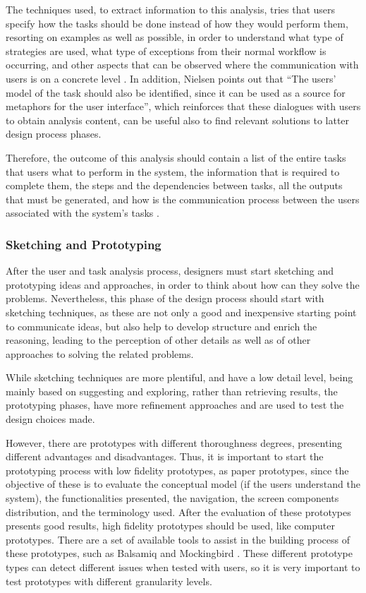 The techniques used, to extract information to this analysis, tries that users specify how the tasks should be done instead of how they would perform them, resorting on examples as well as possible, in order to understand what type of strategies are used, what type of exceptions from their normal workflow is occurring, and other aspects that can be observed where the communication with users is on a concrete level \cite{usabilityEngineering}. In addition, Nielsen \cite{usabilityEngineering} points out that  “The users' model of the task should also be identified, since it can be used as a source for metaphors for the user interface”, which reinforces that these dialogues with users to obtain analysis content, can be useful also to find relevant solutions to latter design process phases.

Therefore, the outcome of this analysis should contain a list of the entire tasks that users what to perform in the system, the information that is required to complete them, the steps and the dependencies between tasks, all the outputs that must be generated, and how is the communication process between the users associated with the system’s tasks \cite{usabilityEngineering}.


\subsubsection{Sketching and Prototyping}
\label{subsubsec:sketching_and_prototyping}
After the user and task analysis process, designers must start sketching and prototyping ideas and approaches, in order to think about how can they solve the problems. Nevertheless, this phase of the design process should start with sketching techniques, as these are not only a good and inexpensive starting point to communicate ideas, but also help to develop structure and enrich the reasoning, leading to the perception of other details as well as of other approaches to solving the related problems.

While sketching techniques are more plentiful, and have a low detail level, being mainly based on suggesting and exploring, rather than retrieving results, the prototyping phases, have more refinement approaches and are used to test the design choices made.

However, there are prototypes with different thoroughness degrees, presenting different advantages and disadvantages. Thus, it is important to start the prototyping process with low fidelity prototypes, as paper prototypes, since the objective of these is to evaluate the conceptual model (if the users understand the system), the functionalities presented, the navigation, the screen components distribution, and the terminology used. After the evaluation of these prototypes presents good results, high fidelity prototypes should be used, like computer prototypes. There are a set of available tools to assist in the building process of these prototypes, such as Balsamiq \cite{balsamiq} and Mockingbird \cite{mockingbird}. These different prototype types can detect different issues when tested with users, so it is very important to test prototypes with different granularity levels.

